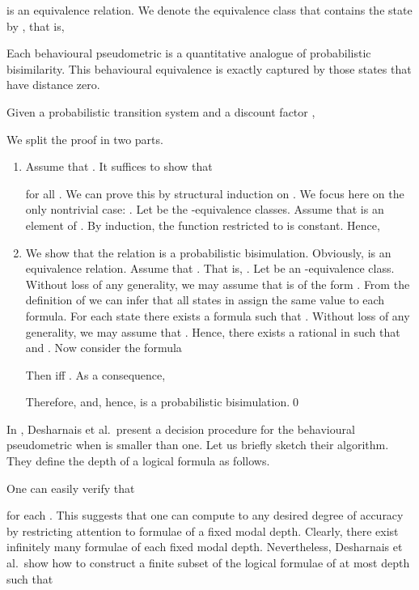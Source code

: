 \documentclass{LMCS}
\begin{document}
is an equivalence relation.  We denote the equivalence class that
contains the state  by , that is,


Each behavioural pseudometric  is a quantitative analogue
of probabilistic bisimilarity.  This behavioural equivalence is
exactly captured by those states that have distance zero.

\begin{prop}
\label{proposition:2}
Given a probabilistic transition system  and
a discount factor , 

\end{prop}
\proof We split the proof in two parts.
\begin{enumerate}[]
\item
Assume that .  It suffices to show that

for all .  We can prove this by structural induction
on .  We focus here on the only nontrivial case: 
.
Let  be the -equivalence
classes.  Assume that  is an element of .
By induction, the function 
restricted to  is constant.  Hence,

\item
We show that the relation  
is a probabilistic bisimulation.  Obviously,  is
an equivalence relation.  Assume that .
That is, .  Let  be an -equivalence
class.  Without loss of any generality, we may assume that  is of
the form .  From the definition of  we can infer that
all states in  assign
the same value to each formula.  For each state 
there exists a formula  such that 
.
Without loss of any generality, we may assume that 
.
Hence, there exists a rational  in  such that
 and
. 
Now consider the formula

Then  iff .
As a consequence,

Therefore, 
and, hence,  is a probabilistic bisimulation.\qed
\end{enumerate}


In \cite{DGJP99:concur}, Desharnais et al.\ present a decision procedure
for the behavioural pseudometric  when  is 
smaller than one.  Let us briefly sketch their algorithm.  They
define the depth of a logical formula as follows.

One can easily verify that 

for each .
This suggests that one can compute  to any desired degree of 
accuracy by restricting attention to formulae  of a fixed modal 
depth. Clearly, there exist infinitely many formulae of each fixed modal 
depth.  Nevertheless, Desharnais et al.\ show how to construct a finite 
subset  of the logical formulae of at most depth  such 
that
\end{document}
